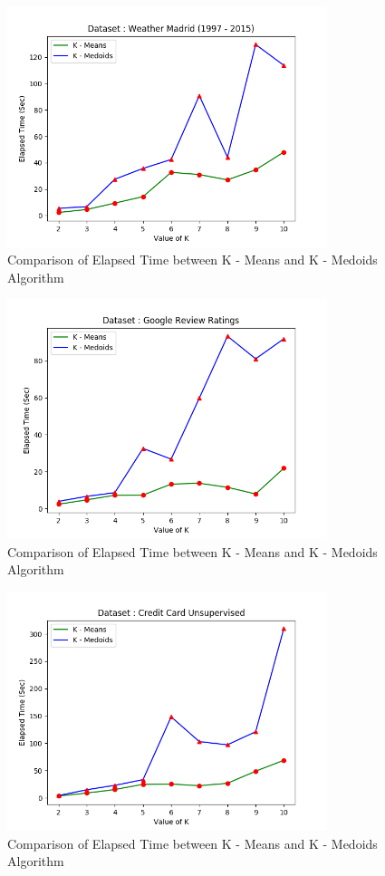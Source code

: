\documentclass[12pt]{article}
\begin{document}
\begin{figure}[]
	\centering
	\includegraphics[width = 0.75\linewidth, height = 7cm]{Weather.png}
	\caption{Comparison of Elapsed Time between K - Means and K - Medoids Algorithm}
	\label{fig:weather}
\end{figure}

\begin{figure}[]
	\centering
	\includegraphics[width = 0.75\linewidth, height = 7cm]{Google.png}
	\caption{Comparison of Elapsed Time between K - Means and K - Medoids Algorithm}
	\label{fig:google}
\end{figure}

\begin{figure}[]
	\centering
	\includegraphics[width = 0.75\linewidth, height = 7cm]{CreditCard.png}
	\caption{Comparison of Elapsed Time between K - Means and K - Medoids Algorithm}
	\label{fig:credit}
\end{figure}
\end{document}
